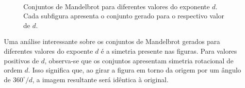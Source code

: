 \begin{enumerate}
\begin{figure}[H]
{        }
        \\
        \caption{Conjuntos de Mandelbrot para diferentes valores do exponente $d$. Cada subfigura apresenta o conjunto gerado para o respectivo valor de $d$.}
\end{figure} 

        Uma análise interessante sobre os conjuntos de Mandelbrot gerados para diferentes valores do expoente $d$ é a simetria presente nas figuras. Para valores positivos de $d$, observa-se que os conjuntos apresentam simetria rotacional de ordem $d$. Isso significa que, ao girar a figura em torno da origem por um ângulo de $360^\circ / d$\cite{peitgen1986beauty}, a imagem resultante será idêntica à original.


\end{enumerate}
